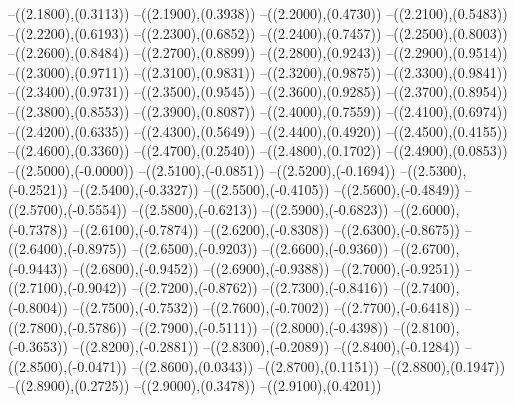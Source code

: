 {	--({\sx*(2.1800)},{\sy*(0.3113)})
	--({\sx*(2.1900)},{\sy*(0.3938)})
	--({\sx*(2.2000)},{\sy*(0.4730)})
	--({\sx*(2.2100)},{\sy*(0.5483)})
	--({\sx*(2.2200)},{\sy*(0.6193)})
	--({\sx*(2.2300)},{\sy*(0.6852)})
	--({\sx*(2.2400)},{\sy*(0.7457)})
	--({\sx*(2.2500)},{\sy*(0.8003)})
	--({\sx*(2.2600)},{\sy*(0.8484)})
	--({\sx*(2.2700)},{\sy*(0.8899)})
	--({\sx*(2.2800)},{\sy*(0.9243)})
	--({\sx*(2.2900)},{\sy*(0.9514)})
	--({\sx*(2.3000)},{\sy*(0.9711)})
	--({\sx*(2.3100)},{\sy*(0.9831)})
	--({\sx*(2.3200)},{\sy*(0.9875)})
	--({\sx*(2.3300)},{\sy*(0.9841)})
	--({\sx*(2.3400)},{\sy*(0.9731)})
	--({\sx*(2.3500)},{\sy*(0.9545)})
	--({\sx*(2.3600)},{\sy*(0.9285)})
	--({\sx*(2.3700)},{\sy*(0.8954)})
	--({\sx*(2.3800)},{\sy*(0.8553)})
	--({\sx*(2.3900)},{\sy*(0.8087)})
	--({\sx*(2.4000)},{\sy*(0.7559)})
	--({\sx*(2.4100)},{\sy*(0.6974)})
	--({\sx*(2.4200)},{\sy*(0.6335)})
	--({\sx*(2.4300)},{\sy*(0.5649)})
	--({\sx*(2.4400)},{\sy*(0.4920)})
	--({\sx*(2.4500)},{\sy*(0.4155)})
	--({\sx*(2.4600)},{\sy*(0.3360)})
	--({\sx*(2.4700)},{\sy*(0.2540)})
	--({\sx*(2.4800)},{\sy*(0.1702)})
	--({\sx*(2.4900)},{\sy*(0.0853)})
	--({\sx*(2.5000)},{\sy*(-0.0000)})
	--({\sx*(2.5100)},{\sy*(-0.0851)})
	--({\sx*(2.5200)},{\sy*(-0.1694)})
	--({\sx*(2.5300)},{\sy*(-0.2521)})
	--({\sx*(2.5400)},{\sy*(-0.3327)})
	--({\sx*(2.5500)},{\sy*(-0.4105)})
	--({\sx*(2.5600)},{\sy*(-0.4849)})
	--({\sx*(2.5700)},{\sy*(-0.5554)})
	--({\sx*(2.5800)},{\sy*(-0.6213)})
	--({\sx*(2.5900)},{\sy*(-0.6823)})
	--({\sx*(2.6000)},{\sy*(-0.7378)})
	--({\sx*(2.6100)},{\sy*(-0.7874)})
	--({\sx*(2.6200)},{\sy*(-0.8308)})
	--({\sx*(2.6300)},{\sy*(-0.8675)})
	--({\sx*(2.6400)},{\sy*(-0.8975)})
	--({\sx*(2.6500)},{\sy*(-0.9203)})
	--({\sx*(2.6600)},{\sy*(-0.9360)})
	--({\sx*(2.6700)},{\sy*(-0.9443)})
	--({\sx*(2.6800)},{\sy*(-0.9452)})
	--({\sx*(2.6900)},{\sy*(-0.9388)})
	--({\sx*(2.7000)},{\sy*(-0.9251)})
	--({\sx*(2.7100)},{\sy*(-0.9042)})
	--({\sx*(2.7200)},{\sy*(-0.8762)})
	--({\sx*(2.7300)},{\sy*(-0.8416)})
	--({\sx*(2.7400)},{\sy*(-0.8004)})
	--({\sx*(2.7500)},{\sy*(-0.7532)})
	--({\sx*(2.7600)},{\sy*(-0.7002)})
	--({\sx*(2.7700)},{\sy*(-0.6418)})
	--({\sx*(2.7800)},{\sy*(-0.5786)})
	--({\sx*(2.7900)},{\sy*(-0.5111)})
	--({\sx*(2.8000)},{\sy*(-0.4398)})
	--({\sx*(2.8100)},{\sy*(-0.3653)})
	--({\sx*(2.8200)},{\sy*(-0.2881)})
	--({\sx*(2.8300)},{\sy*(-0.2089)})
	--({\sx*(2.8400)},{\sy*(-0.1284)})
	--({\sx*(2.8500)},{\sy*(-0.0471)})
	--({\sx*(2.8600)},{\sy*(0.0343)})
	--({\sx*(2.8700)},{\sy*(0.1151)})
	--({\sx*(2.8800)},{\sy*(0.1947)})
	--({\sx*(2.8900)},{\sy*(0.2725)})
	--({\sx*(2.9000)},{\sy*(0.3478)})
	--({\sx*(2.9100)},{\sy*(0.4201)})
}
